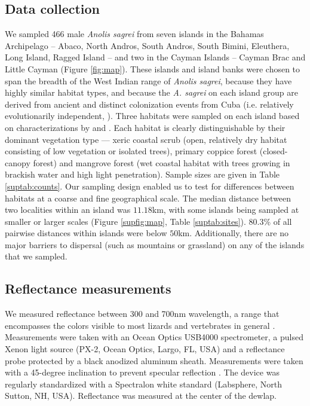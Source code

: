 
\subsection*{Data collection}
	
We sampled 466 male \textit{Anolis sagrei} from seven islands in the Bahamas Archipelago -- Abaco, North Andros, South Andros, South Bimini, Eleuthera, Long Island, Ragged Island -- and two in the Cayman Islands -- Cayman Brac and Little Cayman (Figure \ref{fig:map}). These islands and island banks were chosen to span the breadth of the West Indian range of \textit{Anolis sagrei}, because they have highly similar habitat types,  and because the \textit{A. sagrei} on each island group are derived from ancient and distinct colonization events from Cuba (i.e. relatively evolutionarily independent, \citealt{Reynolds2020}). Three habitats were sampled on each island based on characterizations by \citet{Howard1950} and \citet{Schoener1968}. Each habitat is clearly distinguishable by their dominant vegetation type --- xeric coastal scrub (open, relatively dry habitat consisting of low vegetation or isolated trees), primary coppice forest (closed-canopy forest) and mangrove forest (wet coastal habitat with trees growing in brackish water and high light penetration). Sample sizes are given in Table \ref{suptab:counts}. Our sampling design enabled us to test for differences between habitats at a coarse and fine geographical scale. The median distance between two localities within an island was $11.18$km, with some islands being sampled at smaller or larger scales (Figure \ref{supfig:map}, Table \ref{suptab:sites}). $80.3$\% of all pairwise distances within islands were below $50$km. Additionally, there are no major barriers to dispersal (such as mountains or grassland) on any of the islands that we sampled.
	
\subsection*{Reflectance measurements}

We measured reflectance between 300 and 700nm wavelength, a range that encompasses the colors visible to most lizards and vertebrates in general \citep{Lazareva2012}. Measurements were taken with an Ocean Optics USB4000 spectrometer, a pulsed Xenon light source (PX-2, Ocean Optics, Largo, FL, USA) and a reflectance probe protected by a black anodized aluminum sheath. Measurements were taken with a 45-degree inclination to prevent specular reflection \citep{Endler1990}. The device was regularly standardized with a Spectralon white standard (Labsphere, North Sutton, NH, USA). Reflectance was measured at the center of the dewlap.

